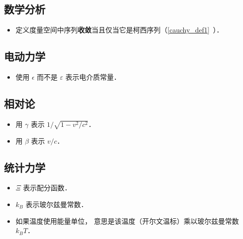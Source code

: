 \subsection{数学分析}
\begin{itemize}
\item 定义度量空间中序列\textbf{收敛}当且仅当它是柯西序列（\autoref{cauchy_def1}~）．
\end{itemize}

\subsection{电动力学}
\begin{itemize}
\item 使用 $\epsilon$ 而不是 $\varepsilon$ 表示电介质常量．
\end{itemize}

\subsection{相对论}
\begin{itemize}
\item 用 $\gamma$ 表示 $1/\sqrt{1 - v^2/c^2}$．
\item 用 $\beta$ 表示 $v/c$．
\end{itemize}

\subsection{统计力学}
\begin{itemize}
\item $\Xi$ 表示配分函数．
\item $k_B$ 表示玻尔兹曼常数．
\item 如果温度使用能量单位， 意思是该温度（开尔文温标）乘以玻尔兹曼常数 $k_B T$．
\end{itemize}
